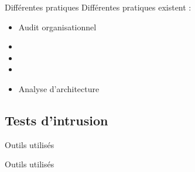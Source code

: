 \documentclass{beamer}
\newcommand{\colorized}[1]{{\color{red}{#1}}}
\begin{document}
		\begin{frame}{Différentes pratiques}
			Différentes pratiques existent : 
			\begin{itemize}
				\item Audit organisationnel
				\item \colorized{Tests d'intrusion (fuzzing)}
				\item \colorized{Revue de code source}
				\item \colorized{Relevés de configuration}
				\item Analyse d'architecture
			\end{itemize}		
		\end{frame}
	
	\subsection{Tests d'intrusion} 
		\begin{frame}{Outils utilisés}
		\end{frame}
		\begin{frame}{Outils utilisés}
		\end{frame}
\end{document}

